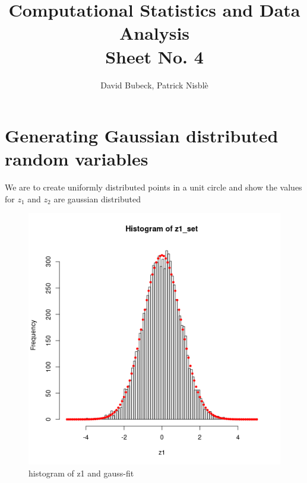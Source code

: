 \documentclass[11pt, a4paper, reqno]{scrartcl}
\begin{document}
    \title{Computational Statistics and Data Analysis\\Sheet No. 4}
    \author{David Bubeck, Patrick Nisbl\`e}
    \maketitle


    \section{Generating Gaussian distributed random variables}
        We are to create uniformly distributed points in a unit circle and show the values for $z_1$ and $z_2$ are gaussian distributed
        
        
    
        \begin{figure}[H]
            \includegraphics[height=.5\paperheight6]{ex11.png}
            \caption{histogram of z1 and gauss-fit}
        \end{figure}
        
\end{document}
